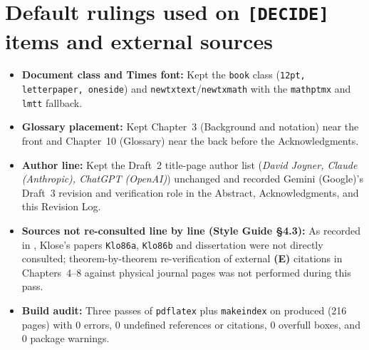 \documentclass[12pt,letterpaper]{amsart}
\begin{document}
\section{Default rulings used on \texttt{[DECIDE]} items and external sources}
\begin{itemize}[leftmargin=*]
\item \textbf{Document class and Times font:} Kept the \texttt{book} class (\texttt{12pt, letterpaper, oneside}) and \texttt{newtxtext}/\texttt{newtxmath} with the \texttt{mathptmx} and \texttt{lmtt} fallback.
\item \textbf{Glossary placement:} Kept Chapter~3 (Background and notation) near the front and Chapter~10 (Glossary) near the back before the Acknowledgments.
\item \textbf{Author line:} Kept the Draft~2 title-page author list (\emph{David Joyner, Claude (Anthropic), ChatGPT (OpenAI)}) unchanged and recorded Gemini (Google)'s Draft~3 revision and verification role in the Abstract, Acknowledgments, and this Revision Log.
\item \textbf{Sources not re-consulted line by line (Style Guide \S4.3):} As recorded in , Klose's papers \texttt{Klo86a}, \texttt{Klo86b} and dissertation were not directly consulted; theorem-by-theorem re-verification of external \textbf{(E)} citations in Chapters~4--8 against physical journal pages was not performed during this pass.
\item \textbf{Build audit:} Three passes of \texttt{pdflatex} plus \texttt{makeindex} on  produced  (216 pages) with $0$ errors, $0$ undefined references or citations, $0$ overfull boxes, and $0$ package warnings.
\end{itemize}
\end{document}
